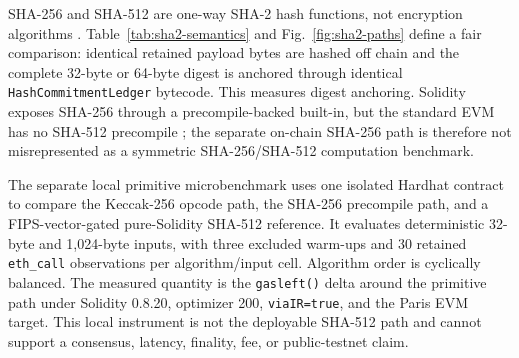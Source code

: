 SHA-256 and SHA-512 are one-way SHA-2 hash functions, not encryption algorithms
\cite{nistFips1804}. Table~\ref{tab:sha2-semantics} and
Fig.~\ref{fig:sha2-paths} define a fair comparison: identical retained payload
bytes are hashed off chain and the complete 32-byte or 64-byte digest is
anchored through identical \texttt{HashCommitmentLedger} bytecode. This measures
digest anchoring. Solidity exposes SHA-256 through a precompile-backed built-in,
but the standard EVM has no SHA-512 precompile \cite{solidityCrypto}; the
separate on-chain SHA-256 path is therefore not misrepresented as a symmetric
SHA-256/SHA-512 computation benchmark.

The separate local primitive microbenchmark uses one isolated Hardhat contract
to compare the Keccak-256 opcode path, the SHA-256 precompile path, and a
FIPS-vector-gated pure-Solidity SHA-512 reference. It evaluates deterministic
32-byte and 1,024-byte inputs, with three excluded warm-ups and 30 retained
\texttt{eth\_call} observations per algorithm/input cell. Algorithm order is
cyclically balanced. The measured quantity is the \texttt{gasleft()} delta
around the primitive path under Solidity 0.8.20, optimizer 200,
\texttt{viaIR=true}, and the Paris EVM target. This local instrument is not the
deployable SHA-512 path and cannot support a consensus, latency, finality, fee,
or public-testnet claim.





